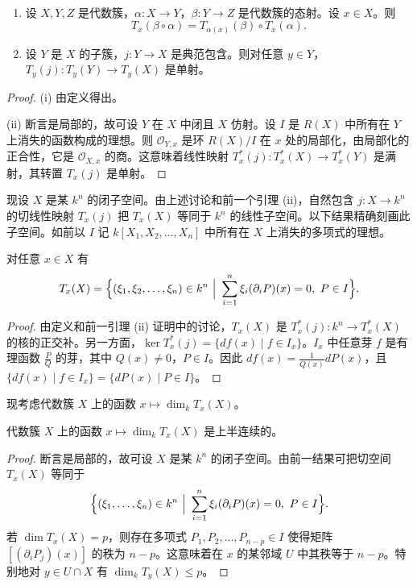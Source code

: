 \begin{lemma}\ 
\begin{enumerate}[label=(\roman*)]
  \item 设 $X,Y,Z$ 是代数簇，$\alpha:X\to Y$，$\beta:Y\to Z$ 是代数簇的态射。设 $x\in X$。则
  $$T_x(\beta\circ\alpha)=T_{\alpha(x)}(\beta)\circ T_x(\alpha).$$
  \item 设 $Y$ 是 $X$ 的子簇，$j:Y\to X$ 是典范包含。则对任意 $y\in Y$，$T_y(j):T_y(Y)\to T_y(X)$ 是单射。
\end{enumerate}
\end{lemma}

\begin{proof}
(i) 由定义得出。

(ii) 断言是局部的，故可设 $Y$ 在 $X$ 中闭且 $X$ 仿射。设 $I$ 是 $R(X)$ 中所有在 $Y$ 上消失的函数构成的理想。则 $\mathcal{O}_{Y,x}$ 是环 $R(X)/I$ 在 $x$ 处的局部化，由局部化的正合性，它是 $\mathcal{O}_{X,x}$ 的商。这意味着线性映射 $T^*_x(j):T^*_x(X)\to T^*_x(Y)$ 是满射，其转置 $T_x(j)$ 是单射。
\end{proof}

现设 $X$ 是某 $k^n$ 的闭子空间。由上述讨论和前一个引理 (ii)，自然包含 $j:X\to k^n$ 的切线性映射 $T_x(j)$ 把 $T_x(X)$ 等同于 $k^n$ 的线性子空间。以下结果精确刻画此子空间。如前以 $I$ 记 $k[X_1,X_2,\dots,X_n]$ 中所有在 $X$ 上消失的多项式的理想。

\begin{lemma}
对任意 $x\in X$ 有
$$T_x(X)=\Bigl\{(\xi_1,\xi_2,\dots,\xi_n)\in k^n\ \Big|\ \sum_{i=1}^n\xi_i(\partial_iP)(x)=0,\ P\in I\Bigr\}.$$
\end{lemma}

\begin{proof}
由定义和前一引理 (ii) 证明中的讨论，$T_x(X)$ 是 $T^*_x(j):k^n\to T^*_x(X)$ 的核的正交补。另一方面，$\ker T^*_x(j)=\{df(x)\mid f\in I_x\}$。$I_x$ 中任意芽 $f$ 是有理函数 $\frac{P}{Q}$ 的芽，其中 $Q(x)\neq 0$，$P\in I$。因此 $df(x)=\frac{1}{Q(x)}dP(x)$，且 $\{df(x)\mid f\in I_x\}=\{dP(x)\mid P\in I\}$。
\end{proof}

现考虑代数簇 $X$ 上的函数 $x\longmapsto\dim_kT_x(X)$。

\begin{proposition}
代数簇 $X$ 上的函数 $x\longmapsto\dim_k T_x(X)$ 是上半连续的。
\end{proposition}

\begin{proof}
断言是局部的，故可设 $X$ 是某 $k^n$ 的闭子空间。由前一结果可把切空间 $T_x(X)$ 等同于
$$\Bigl\{(\xi_1,\dots,\xi_n)\in k^n\ \Big|\ \sum_{i=1}^n\xi_i(\partial_iP)(x)=0,\ P\in I\Bigr\}.$$
若 $\dim T_x(X)=p$，则存在多项式 $P_1,P_2,\dots,P_{n-p}\in I$ 使得矩阵 $[(\partial_iP_j)(x)]$ 的秩为 $n-p$。这意味着在 $x$ 的某邻域 $U$ 中其秩等于 $n-p$。特别地对 $y\in U\cap X$ 有 $\dim_kT_y(X)\le p$。
\end{proof}

